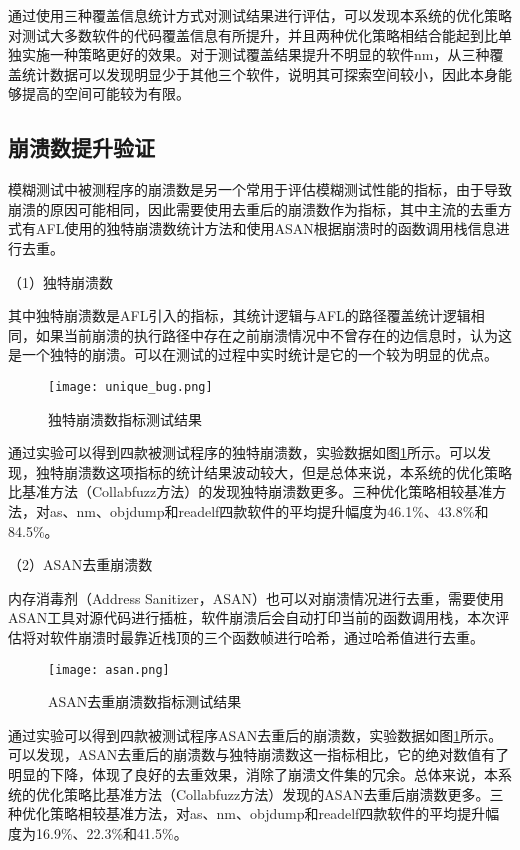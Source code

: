 \documentclass[master]{thesis-uestc}
\begin{document}
通过使用三种覆盖信息统计方式对测试结果进行评估，可以发现本系统的优化策略对测试大多数软件的代码覆盖信息有所提升，并且两种优化策略相结合能起到比单独实施一种策略更好的效果。对于测试覆盖结果提升不明显的软件nm，从三种覆盖统计数据可以发现明显少于其他三个软件，说明其可探索空间较小，因此本身能够提高的空间可能较为有限。


\subsection{崩溃数提升验证}

模糊测试中被测程序的崩溃数是另一个常用于评估模糊测试性能的指标，由于导致崩溃的原因可能相同，因此需要使用去重后的崩溃数作为指标，其中主流的去重方式有AFL使用的独特崩溃数统计方法和使用ASAN根据崩溃时的函数调用栈信息进行去重。

（1）独特崩溃数

其中独特崩溃数是AFL引入的指标，其统计逻辑与AFL的路径覆盖统计逻辑相同，如果当前崩溃的执行路径中存在之前崩溃情况中不曾存在的边信息时，认为这是一个独特的崩溃。可以在测试的过程中实时统计是它的一个较为明显的优点。

\begin{figure}[!htbp]
    \vspace{6pt}
    \centering
    \texttt{[image: unique\_bug.png]}
    \caption{独特崩溃数指标测试结果}
    \label{unique_bug}
\end{figure}

通过实验可以得到四款被测试程序的独特崩溃数，实验数据如图\ref{unique_bug}所示。可以发现，独特崩溃数这项指标的统计结果波动较大，但是总体来说，本系统的优化策略比基准方法（Collabfuzz方法）的发现独特崩溃数更多。三种优化策略相较基准方法，对as、nm、objdump和readelf四款软件的平均提升幅度为46.1\%、43.8\%和84.5\%。

（2）ASAN去重崩溃数

内存消毒剂（Address Sanitizer，ASAN）也可以对崩溃情况进行去重，需要使用ASAN工具对源代码进行插桩，软件崩溃后会自动打印当前的函数调用栈，本次评估将对软件崩溃时最靠近栈顶的三个函数帧进行哈希，通过哈希值进行去重。

\begin{figure}[!htbp]
    \vspace{6pt}
    \centering
    \texttt{[image: asan.png]}
    \caption{ASAN去重崩溃数指标测试结果}
    \label{asan_bug}
\end{figure}

通过实验可以得到四款被测试程序ASAN去重后的崩溃数，实验数据如图\ref{unique_bug}所示。可以发现，ASAN去重后的崩溃数与独特崩溃数这一指标相比，它的绝对数值有了明显的下降，体现了良好的去重效果，消除了崩溃文件集的冗余。总体来说，本系统的优化策略比基准方法（Collabfuzz方法）发现的ASAN去重后崩溃数更多。三种优化策略相较基准方法，对as、nm、objdump和readelf四款软件的平均提升幅度为16.9\%、22.3\%和41.5\%。
\end{document}
